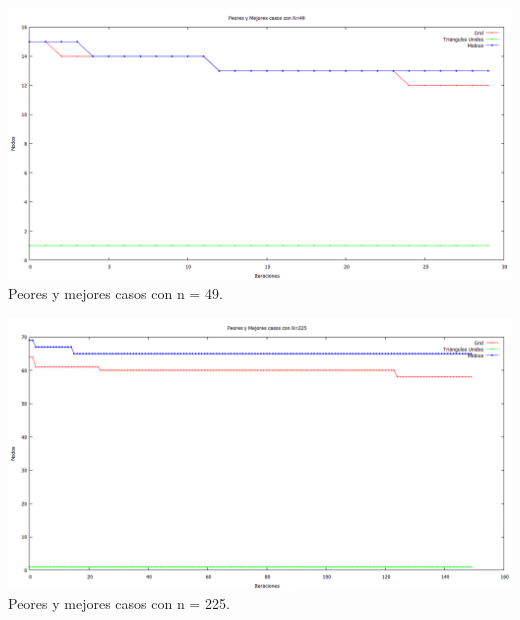 \begin{center}
\includegraphics[width=17cm]{./graficos/grasp/peoresymejoresn49.png}\\
Peores y mejores casos con n = 49.
\end{center}

\begin{center}
\includegraphics[width=17cm]{./graficos/grasp/peoresymejoresn225.png}\\
Peores y mejores casos con n = 225.
\end{center}


